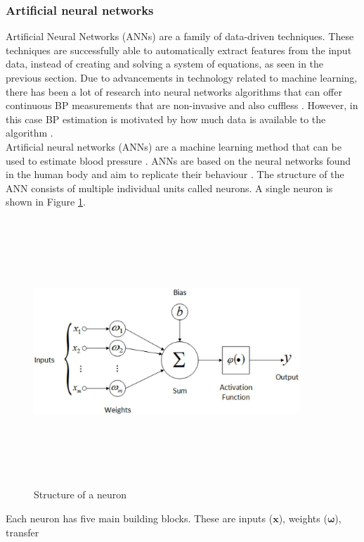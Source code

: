  \subsubsection{Artificial neural networks}
 Artificial Neural Networks (ANNs) are a family of data-driven techniques. These techniques are 
 successfully able to automatically extract features from the input data, instead of creating and solving a system of equations, as seen in the previous section. Due to advancements in technology related to machine learning, there has 
 been a lot of research into neural networks algorithms that can offer 
 continuous BP measurements that are non-invasive and also 
 cuffless \cite{Pradenas2020}. However, in this case BP 
 estimation is motivated by how much data is available to the 
 algorithm \cite{ElHajj2020}. \\ \newline \noindent Artificial neural 
 networks (ANNs) are a machine learning method that can be used to estimate 
 blood pressure \cite{Pradenas2020}. ANNs are based on the neural networks 
 found in the human body and aim to replicate their behaviour \cite{Yang2020}. The 
 structure of the ANN consists of multiple individual units called neurons. A single neuron is shown in Figure 
 \ref{neuron}.  \begin{figure}[H]
    \centering
    \includegraphics[width=10cm,height=10cm,keepaspectratio]{Background/neuron.jpeg}
    \caption{Structure of a neuron \cite{Almusawi2020}}
    \label{neuron}
\end{figure}\noindent Each 
 neuron has five main building blocks. These are inputs ($\bm{x}$), weights ($\bm{\omega}$), transfer 
